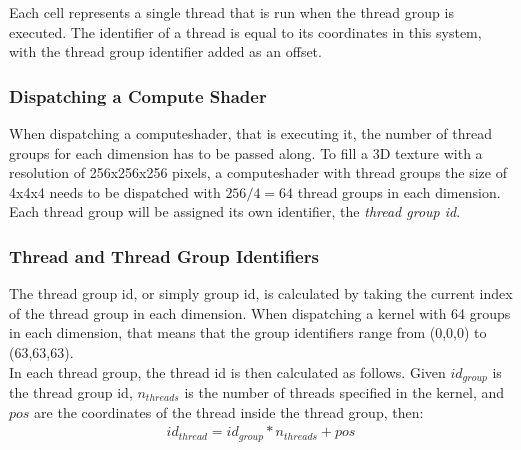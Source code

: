 \begin{figure}[H]
    \label{img:tikz:compute:threads}
\end{figure}
\noindent
Each cell represents a single thread that is run when the thread group is executed.
The identifier of a thread is equal to its coordinates in this system, with the thread group identifier added as an offset.

\subsubsection{Dispatching a Compute Shader}
When dispatching a \gls{computeshader}, that is executing it, the number of thread groups for each dimension has to be passed along.
To fill a 3D texture with a resolution of 256x256x256 pixels, a \gls{computeshader} with thread groups the size of 4x4x4 needs to be dispatched with $256 / 4 = 64$ thread groups in each dimension.
\\
Each thread group will be assigned its own identifier, the \emph{thread group id}.

\pagebreak

\subsubsection{Thread and Thread Group Identifiers}
The thread group id, or simply group id, is calculated by taking the current index of the thread group in each dimension.
When dispatching a \gls{kernel} with 64 groups in each dimension, that means that the group identifiers range from (0,0,0) to (63,63,63).
\\
In each thread group, the thread id is then calculated as follows.
Given $id_{group}$ is the thread group id, $n_{threads}$ is the number of threads specified in the \gls{kernel}, and  $pos$ are the coordinates of the thread inside the thread group, then:
$$
\begin{array}{l}
    id_{thread} = id_{group} * n_{threads} + pos
\end{array}
$$

